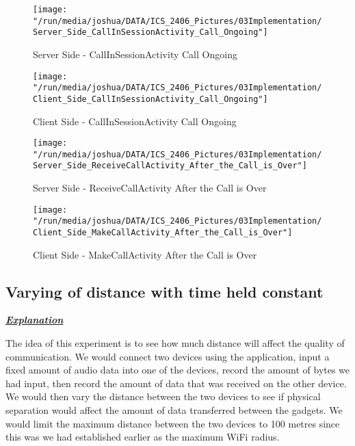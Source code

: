 \documentclass[12pt,svgnames,smaller]{article} %
\begin{document}
		\begin{figure}
			\centering
			\begin{minipage}{.5\textwidth}
				\centering
				\texttt{[image: "/run/media/joshua/DATA/ICS\_2406\_Pictures/03Implementation/Server\_Side\_CallInSessionActivity\_Call\_Ongoing"]}
				\caption{Server Side - CallInSessionActivity Call Ongoing}
				\label{fig:Implementation-Figure13}			
			\end{minipage}%
			\begin{minipage}{0.5\textwidth}
				\centering
				\texttt{[image: "/run/media/joshua/DATA/ICS\_2406\_Pictures/03Implementation/Client\_Side\_CallInSessionActivity\_Call\_Ongoing"]}
				\caption{Client Side - CallInSessionActivity Call Ongoing}
				\label{fig:Implementation-Figure14}
			\end{minipage}
		\end{figure} 		

		\begin{figure}
			\centering
			\begin{minipage}{.5\textwidth}
				\centering
				\texttt{[image: "/run/media/joshua/DATA/ICS\_2406\_Pictures/03Implementation/Server\_Side\_ReceiveCallActivity\_After\_the\_Call\_is\_Over"]}
				\caption{Server Side - ReceiveCallActivity After the Call is Over}
				\label{fig:Implementation-Figure15}			
			\end{minipage}%
			\begin{minipage}{0.5\textwidth}
				\centering
				\texttt{[image: "/run/media/joshua/DATA/ICS\_2406\_Pictures/03Implementation/Client\_Side\_MakeCallActivity\_After\_the\_Call\_is\_Over"]}
				\caption{Client Side - MakeCallActivity After the Call is Over}
				\label{fig:Implementation-Figure16}
			\end{minipage}
		\end{figure} 		

	

	\subsection{\textbf{Varying of distance with time held constant}}
	
	\textbf{\textit{\underline{Explanation}}}
	
	The idea of this experiment is to see how much distance will affect the quality of communication. We would connect two devices using the application, input a fixed amount of audio data into one of the devices, record the amount of bytes we had input, then record the amount of data that was received on the other device. We would then vary the distance between the two devices to see if physical separation would affect the amount of data transferred between the gadgets. We would limit the maximum distance between the two devices to 100 metres since this was we had established earlier as the maximum WiFi radius. 
	
\end{document}
